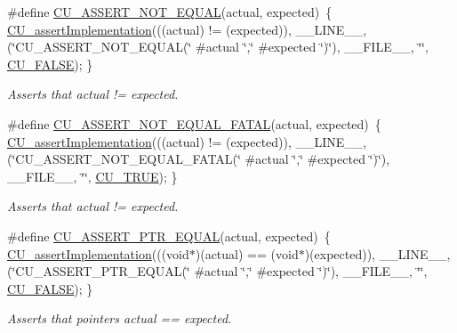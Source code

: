 \begin{DoxyCompactItemize}
\#define \hyperlink{group___framework_ga7570d2488e79c219c8e2d38a94f47761}{C\+U\+\_\+\+A\+S\+S\+E\+R\+T\+\_\+\+N\+O\+T\+\_\+\+E\+Q\+U\+A\+L}(actual, expected)~\{ \hyperlink{group___framework_gad409fc536d9d3fb5f659c76421e8ce3b}{C\+U\+\_\+assert\+Implementation}(((actual) != (expected)), \+\_\+\+\_\+\+L\+I\+N\+E\+\_\+\+\_\+, (\char`\"{}C\+U\+\_\+\+A\+S\+S\+E\+R\+T\+\_\+\+N\+O\+T\+\_\+\+E\+Q\+U\+A\+L(\char`\"{} \#actual \char`\"{},\char`\"{} \#expected \char`\"{})\char`\"{}), \+\_\+\+\_\+\+F\+I\+L\+E\+\_\+\+\_\+, \char`\"{}\char`\"{}, \hyperlink{group___framework_ga7453214541b156ef868681eaafe60860}{C\+U\+\_\+\+F\+A\+L\+S\+E}); \}
\begin{DoxyCompactList}\small\item\em Asserts that actual != expected. \end{DoxyCompactList}\item 
\#define \hyperlink{group___framework_ga2ca22661a0fc08c8d439d16fb46f00ba}{C\+U\+\_\+\+A\+S\+S\+E\+R\+T\+\_\+\+N\+O\+T\+\_\+\+E\+Q\+U\+A\+L\+\_\+\+F\+A\+T\+A\+L}(actual, expected)~\{ \hyperlink{group___framework_gad409fc536d9d3fb5f659c76421e8ce3b}{C\+U\+\_\+assert\+Implementation}(((actual) != (expected)), \+\_\+\+\_\+\+L\+I\+N\+E\+\_\+\+\_\+, (\char`\"{}C\+U\+\_\+\+A\+S\+S\+E\+R\+T\+\_\+\+N\+O\+T\+\_\+\+E\+Q\+U\+A\+L\+\_\+\+F\+A\+T\+A\+L(\char`\"{} \#actual \char`\"{},\char`\"{} \#expected \char`\"{})\char`\"{}), \+\_\+\+\_\+\+F\+I\+L\+E\+\_\+\+\_\+, \char`\"{}\char`\"{}, \hyperlink{group___framework_ga99641394bc766ca9c4a295e942fed1ef}{C\+U\+\_\+\+T\+R\+U\+E}); \}
\begin{DoxyCompactList}\small\item\em Asserts that actual != expected. \end{DoxyCompactList}\item 
\#define \hyperlink{group___framework_ga1d0b361ec0526cdf40e536847f4bfc6a}{C\+U\+\_\+\+A\+S\+S\+E\+R\+T\+\_\+\+P\+T\+R\+\_\+\+E\+Q\+U\+A\+L}(actual, expected)~\{ \hyperlink{group___framework_gad409fc536d9d3fb5f659c76421e8ce3b}{C\+U\+\_\+assert\+Implementation}(((void$\ast$)(actual) == (void$\ast$)(expected)), \+\_\+\+\_\+\+L\+I\+N\+E\+\_\+\+\_\+, (\char`\"{}C\+U\+\_\+\+A\+S\+S\+E\+R\+T\+\_\+\+P\+T\+R\+\_\+\+E\+Q\+U\+A\+L(\char`\"{} \#actual \char`\"{},\char`\"{} \#expected \char`\"{})\char`\"{}), \+\_\+\+\_\+\+F\+I\+L\+E\+\_\+\+\_\+, \char`\"{}\char`\"{}, \hyperlink{group___framework_ga7453214541b156ef868681eaafe60860}{C\+U\+\_\+\+F\+A\+L\+S\+E}); \}
\begin{DoxyCompactList}\small\item\em Asserts that pointers actual == expected. \end{DoxyCompactList}\item 

\end{DoxyCompactItemize}
